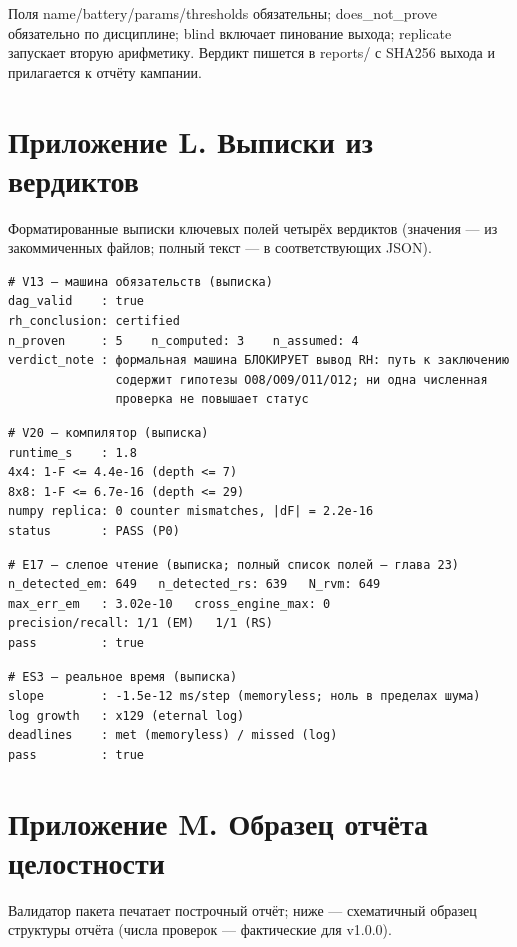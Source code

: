\documentclass[11pt,a4paper]{article}
\begin{document}
Поля name/battery/params/thresholds обязательны; does\_not\_prove обязательно по дисциплине; blind включает пинование выхода; replicate запускает вторую арифметику. Вердикт пишется в reports/ с SHA256 выхода и прилагается к отчёту кампании.

\section{Приложение L. Выписки из вердиктов}

Форматированные выписки ключевых полей четырёх вердиктов (значения — из закоммиченных файлов; полный текст — в соответствующих JSON).

\begin{verbatim}
# V13 — машина обязательств (выписка)
dag_valid    : true
rh_conclusion: certified
n_proven     : 5    n_computed: 3    n_assumed: 4
verdict_note : формальная машина БЛОКИРУЕТ вывод RH: путь к заключению
               содержит гипотезы O08/O09/O11/O12; ни одна численная
               проверка не повышает статус
\end{verbatim}

\begin{verbatim}
# V20 — компилятор (выписка)
runtime_s    : 1.8
4x4: 1-F <= 4.4e-16 (depth <= 7)
8x8: 1-F <= 6.7e-16 (depth <= 29)
numpy replica: 0 counter mismatches, |dF| = 2.2e-16
status       : PASS (P0)
\end{verbatim}

\begin{verbatim}
# E17 — слепое чтение (выписка; полный список полей — глава 23)
n_detected_em: 649   n_detected_rs: 639   N_rvm: 649
max_err_em   : 3.02e-10   cross_engine_max: 0
precision/recall: 1/1 (EM)   1/1 (RS)
pass         : true
\end{verbatim}

\begin{verbatim}
# ES3 — реальное время (выписка)
slope        : -1.5e-12 ms/step (memoryless; ноль в пределах шума)
log growth   : x129 (eternal log)
deadlines    : met (memoryless) / missed (log)
pass         : true
\end{verbatim}

\section{Приложение M. Образец отчёта целостности}

Валидатор пакета печатает построчный отчёт; ниже — схематичный образец структуры отчёта (числа проверок — фактические для v1.0.0).
\end{document}
